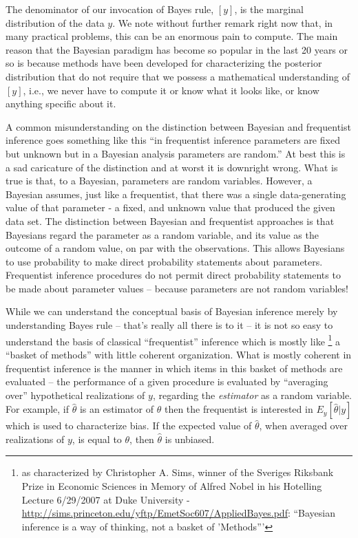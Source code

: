 The denominator of our invocation of Bayes rule, $[y]$,
is the marginal distribution of the data $y$.  We note without further
remark right now that, in many practical problems, this can be an
enormous pain to compute. The main reason that the Bayesian paradigm
has become so popular in the last 20 years or so is because methods
have been developed
for characterizing the posterior distribution that do not
require that we possess a mathematical understanding of $[y]$, i.e.,
we never have to compute it or know what it looks like, or know
anything specific about it.

A common misunderstanding on the distinction between Bayesian and
frequentist inference goes something like this ``in frequentist
inference parameters are fixed but unknown but in a Bayesian analysis
parameters are random.'' At best this is a sad caricature of the
distinction and at worst it is downright wrong. What is true is that,
to a Bayesian, parameters are random variables. However, a Bayesian
assumes, just like a frequentist, that there was a single
data-generating value of that parameter - a fixed, and unknown value
that produced the given data set.
The distinction between Bayesian and frequentist approaches is that
Bayesians regard the parameter as a random variable, and its value as
the outcome of a random value, on par with the observations. This
allows Bayesians to use probability to make direct probability
statements about parameters. Frequentist inference procedures do not
permit direct probability statements to be made about parameter
values -- because parameters are not random variables!

While we can understand the conceptual basis of Bayesian inference
merely by understanding Bayes rule -- that's really all there is to it
-- it is not so easy to understand the basis of classical
``frequentist'' inference which is mostly like
\footnote{as characterized by Christopher A. Sims, winner of the 
Sveriges Riksbank Prize in Economic Sciences in Memory of Alfred Nobel
in his
Hotelling Lecture 6/29/2007 at Duke University - 
\url{http://sims.princeton.edu/yftp/EmetSoc607/AppliedBayes.pdf}:
``Bayesian inference is a way of thinking,
not a basket of 'Methods'''} a ``basket of
methods'' with little coherent organization. What is mostly coherent
in frequentist inference is the manner in which items in this basket
of methods are evaluated -- the performance of a given procedure is
evaluated by ``averaging over'' hypothetical realizations of $y$,
regarding the {\it estimator} as a random variable. For example, if
$\hat{\theta}$ is an estimator of $\theta$ then the frequentist is
interested in $E_{y}[\hat{\theta}|y]$ which is used to characterize
bias. If the expected value of $\hat{\theta}$, when averaged over
realizations of $y$, is equal to $\theta$, then $\hat{\theta}$ is
unbiased.

